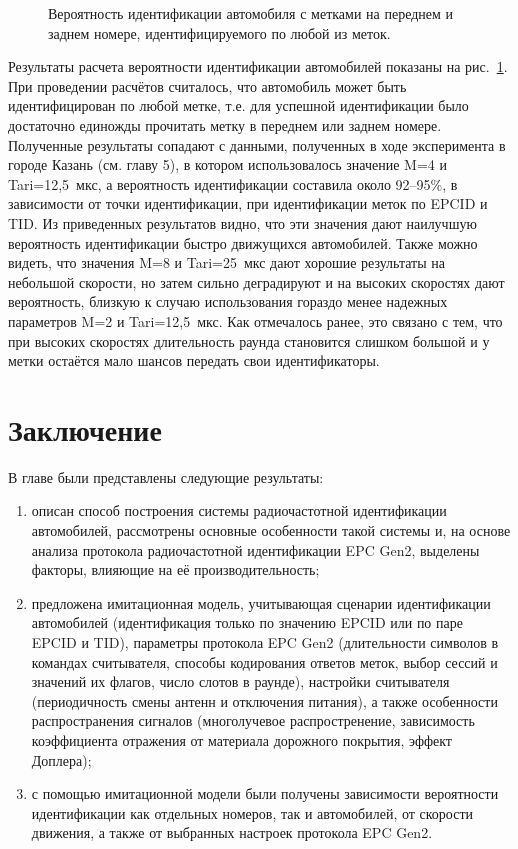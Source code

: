 \begin{figure}[!t]
	\caption{Вероятность идентификации автомобиля с метками на переднем и заднем номере, идентифицируемого по любой из меток.}
	\label{fig:ch2_vehicle_identification_rate}
\end{figure}

Результаты расчета вероятности идентификации автомобилей показаны на рис.~\ref{fig:ch2_vehicle_identification_rate}. При проведении расчётов считалось, что автомобиль может быть идентифицирован по любой метке, т.е. для успешной идентификации было достаточно единожды прочитать метку в переднем или заднем номере. Полученные результаты сопадают с данными, полученных в ходе эксперимента в городе Казань (см. главу 5), в котором использовалось значение M=4 и Tari=12,5~мкс, а вероятность идентификации составила около 92--95\%, в зависимости от точки идентификации, при идентификации меток по EPCID и TID. Из приведенных результатов видно, что эти значения дают наилучшую вероятность идентификации быстро движущихся автомобилей. Также можно видеть, что значения M=8 и Tari=25~мкс дают хорошие результаты на небольшой скорости, но затем сильно деградируют и на высоких скоростях дают вероятность, близкую к случаю использования гораздо менее надежных параметров M=2 и Tari=12,5~мкс. Как отмечалось ранее, это связано с тем, что при высоких скоростях длительность раунда становится слишком большой и у метки остаётся мало шансов передать свои идентификаторы. 



\section{Заключение}\label{sec:ch2_conclusion}
В главе были представлены следующие результаты:
\begin{enumerate}
	\item описан способ построения системы радиочастотной идентификации автомобилей, рассмотрены основные особенности такой системы и, на основе анализа протокола радиочастотной идентификации EPC Gen2, выделены факторы, влияющие на её производительность;
	\item предложена имитационная модель, учитывающая сценарии идентификации автомобилей (идентификация только по значению EPCID или по паре EPCID и TID), параметры протокола EPC Gen2 (длительности символов в командах считывателя, способы кодирования ответов меток, выбор сессий и значений их флагов, число слотов в раунде), настройки считывателя (периодичность смены антенн и отключения питания), а также особенности распространения сигналов (многолучевое распростренение, зависимость коэффициента отражения от материала дорожного покрытия, эффект Доплера);
	\item с помощью имитационной модели были получены зависимости вероятности идентификации как отдельных номеров, так и автомобилей, от скорости движения, а также от выбранных настроек протокола EPC Gen2. 
\end{enumerate}

\FloatBarrier
